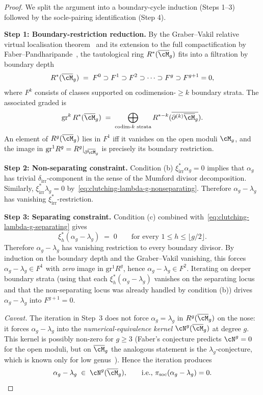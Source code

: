 \begin{proof}
We split the argument into a boundary-cycle induction (Steps 1--3)
followed by the socle-pairing identification (Step 4).

\textbf{Step 1: Boundary-restriction reduction.} By the
Graber--Vakil relative virtual localisation theorem~\cite{GraVak05}
and its extension to the full compactification by
Faber--Pandharipande~\cite{FP00}, the tautological ring
$R^*(\overline{\cM}_g)$ fits into a filtration by boundary depth
\[
R^*(\overline{\cM}_g) \;=\; F^0 \supset F^1 \supset F^2 \supset \cdots
\supset F^g \supset F^{g+1} = 0,
\]
where $F^k$ consists of classes supported on codimension-$\geq k$
boundary strata. The associated graded is
\[
\mathrm{gr}^k\, R^*(\overline{\cM}_g)
\;=\;
\bigoplus_{\text{codim-}k \text{ strata}}
R^{*-k}(\overline{\partial^{(k)}\overline{\cM}_g}).
\]
An element of $R^g(\overline{\cM}_g)$ lies in $F^1$ iff it vanishes
on the open moduli $\cM_g$, and the image in
$\mathrm{gr}^1 R^g = R^g|_{\partial\overline{\cM}_g}$ is
precisely its boundary restriction.

\textbf{Step 2: Non-separating constraint.} Condition (b)
$\xi_{\mathrm{irr}}^*\alpha_g = 0$ implies that $\alpha_g$ has
trivial $\delta_{\mathrm{irr}}$-component in the sense of the
Mumford divisor decomposition. Similarly,
$\xi_{\mathrm{irr}}^*\lambda_g = 0$ by~\eqref{eq:clutching-lambda-g-nonseparating}.
Therefore $\alpha_g - \lambda_g$ has vanishing
$\xi_{\mathrm{irr}}^*$-restriction.

\textbf{Step 3: Separating constraint.} Condition (c) combined
with~\eqref{eq:clutching-lambda-g-separating} gives
\[
\xi_h^*(\alpha_g - \lambda_g) \;=\; 0
\qquad \text{for every } 1 \leq h \leq \lfloor g/2\rfloor.
\]
Therefore $\alpha_g - \lambda_g$ has vanishing restriction to every
boundary divisor. By induction on the boundary depth and the
Graber--Vakil vanishing, this forces $\alpha_g - \lambda_g \in F^1$
with \emph{zero} image in $\mathrm{gr}^1 R^g$, hence
$\alpha_g - \lambda_g \in F^2$. Iterating on deeper boundary strata
(using that each $\xi_h^*(\alpha_g - \lambda_g)$ vanishes on the
separating locus and that the non-separating locus was already
handled by condition (b)) drives $\alpha_g - \lambda_g$ into
$F^{g+1} = 0$.

\emph{Caveat.} The iteration in Step~3 does not force
$\alpha_g = \lambda_g$ in $R^g(\overline{\cM}_g)$ on the nose: it
forces $\alpha_g - \lambda_g$ into the \emph{numerical-equivalence
kernel} $\cN^g(\overline{\cM}_g)$ at degree $g$. This kernel is
possibly non-zero for $g \geq 3$ (Faber's conjecture predicts
$\cN^g = 0$ for the open moduli, but on $\overline{\cM}_g$ the
analogous statement is the $\lambda_g$-conjecture, which is known
only for low genus~\cite{FP00}). Hence the iteration produces
\[
\alpha_g - \lambda_g \;\in\; \cN^g(\overline{\cM}_g),
\qquad \text{i.e., } \pi_{\mathrm{soc}}(\alpha_g - \lambda_g) = 0.
\]


\end{proof}
